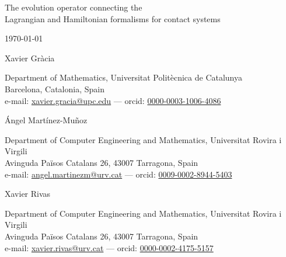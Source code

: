 \documentclass[11pt]{article}
\theoremstyle{plain}
\theoremstyle{definition}
\begin{document}
\parskip=3pt

\vspace{5em}

{\huge\sffamily\raggedright
The evolution operator connecting the\\[1ex] 
Lagrangian and Hamiltonian formalisms for contact systems
}

\vspace{1.5em}

{\large\raggedright
    \today
}

\vspace{1.5em}

{\Large\raggedright\sffamily
    Xavier Gràcia
}\vspace{1mm}\newline
{\raggedright
    Department of Mathematics, Universitat Politècnica de Catalunya\\
    Barcelona, Catalonia, Spain\\
    e-mail: 
    \href{mailto:xavier.gracia@upc.edu}{xavier.gracia@upc.edu} --- {\sc orcid}: 
    \href{https://orcid.org/0000-0003-1006-4086}{0000-0003-1006-4086}
}


\bigskip


{\Large\raggedright\sffamily
    Ángel Martínez-Muñoz
}\vspace{1mm}\newline
{\raggedright
    Department of Computer Engineering and Mathematics, Universitat Rovira i Virgili\\
    Avinguda Països Catalans 26, 43007 Tarragona, Spain\\
    e-mail: \href{mailto:angel.martinezm@urv.cat}{angel.martinezm@urv.cat} --- {\sc orcid}: \href{https://orcid.org/0009-0002-8944-5403}{0009-0002-8944-5403}
}

\bigskip


{\Large\raggedright\sffamily
    Xavier Rivas
}\vspace{1mm}\newline
{\raggedright
    Department of Computer Engineering and Mathematics, Universitat Rovira i Virgili\\
    Avinguda Països Catalans 26, 43007 Tarragona, Spain\\
    e-mail: \href{mailto:xavier.rivas@urv.cat}{xavier.rivas@urv.cat} --- {\sc orcid}: \href{https://orcid.org/0000-0002-4175-5157}{0000-0002-4175-5157}
}

\bigskip
\end{document}
